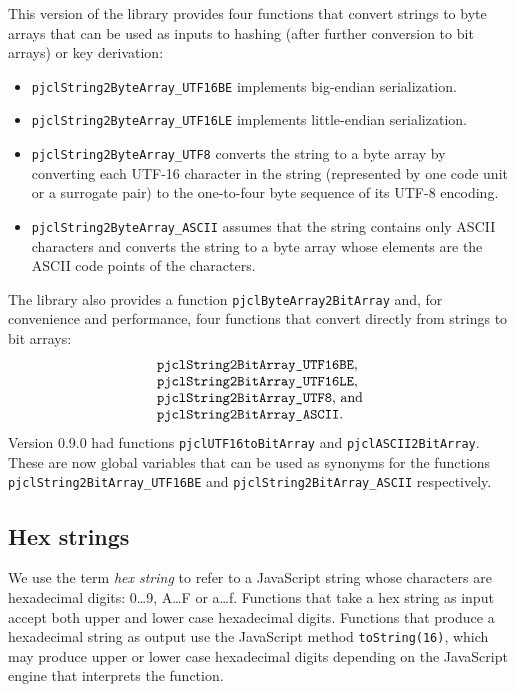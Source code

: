 \documentclass[12pt]{article}
\begin{document}
This version of the library provides four functions that convert strings to
byte arrays that can be used as inputs to hashing (after further conversion
to bit arrays) or key derivation:
\begin{itemize}

\item {\tt pjclString2ByteArray\_UTF16BE} implements big-endian serialization.

\item {\tt pjclString2ByteArray\_UTF16LE} implements little-endian serialization.

\item {\tt pjclString2ByteArray\_UTF8} converts the string to a byte array by 
converting each UTF-16 character in the string (represented by one code unit
or a surrogate pair) to the one-to-four byte sequence of its UTF-8 encoding.

\item {\tt pjclString2ByteArray\_ASCII} assumes that the string contains only
ASCII characters and converts the string to a byte array whose elements are
the ASCII code points of the characters.

\end{itemize}
The library also provides a function
{\tt pjclByteArray2BitArray} and, for convenience and performance, four
functions that convert directly from strings to bit arrays:
$$
\begin{array}{l}
\mbox{{\tt pjclString2BitArray\_UTF16BE},}\\
\mbox{{\tt pjclString2BitArray\_UTF16LE},}\\
\mbox{{\tt pjclString2BitArray\_UTF8}, and}\\
\mbox{{\tt pjclString2BitArray\_ASCII}.}
\end{array}
$$
Version 0.9.0
had functions {\tt pjclUTF16toBitArray} and {\tt pjclASCII2BitArray}.  
These are now global variables that can be used as synonyms for the functions
{\tt pjclString2BitArray\_UTF16BE} and
{\tt pjclString2BitArray\_ASCII}
respectively.

\subsection{Hex strings}

We use the term {\em hex string} to refer to a JavaScript string whose characters are
hexadecimal digits: 0\ldots 9, A\ldots F or a\ldots f.  Functions that
take a hex string as input accept both upper and lower case
hexadecimal digits.  Functions that produce a hexadecimal string as
output use the JavaScript method {\tt toString(16)}, which may produce
upper or lower case hexadecimal digits depending on the JavaScript engine
that interprets the function.
\end{document}
